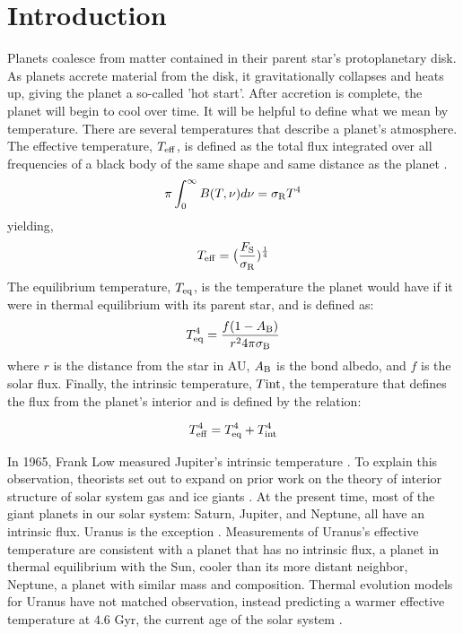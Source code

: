 \documentclass[11pt]{ucscthesisbs}
\begin{document}
\chapter{Introduction}
Planets coalesce from matter contained in their parent star's protoplanetary disk. As planets accrete material from the disk, it gravitationally collapses and heats up, giving the planet a so-called 'hot start'. After accretion is complete, the planet will begin to cool over time. It will be helpful to define what we mean by temperature. There are several temperatures that describe a planet's atmosphere. The effective temperature, $T_{\rm eff}$, is defined as the total flux integrated over all frequencies of a black body of the same shape and same distance as the planet \citep{seager_2010}.
\begin{equation}
    \pi \int_{0}^{\infty} B(T, \nu) d\nu = \sigma_{\rm R}T^{4}
  \label{eq:effective_temp_integral}
\end{equation}  
yielding,
\begin{equation}
    T_{\rm eff} = \big(\frac{F_{\rm S}}{\sigma_{\rm R}})^{\frac{1}{4}} 
  \label{eq:effective_temp}
\end{equation} 
The equilibrium temperature, $T_{\rm eq}$, is the temperature the planet would have if it were in thermal equilibrium with its parent star, and is defined as:
\begin{equation}
    T_{\rm eq}^4 = \frac{f(1-A_{\rm B})}{r^{2} 4 \pi \sigma_{\rm B}}
  \label{eq:equilibrium_temp}
\end{equation} 
where $r$ is the distance from the star in AU, $A_{\rm B}$ is the bond albedo, and $f$ is the solar flux. Finally, the intrinsic temperature, $T{\rm int}$, the temperature that defines the flux from the planet's interior and is defined by the relation:

\begin{equation}
    T_{\rm eff}^4 =  T_{\rm eq}^4 +  T_{\rm int}^4
  \label{eq:effective_temp}
\end{equation} 

In 1965, Frank Low measured Jupiter's intrinsic temperature \citep{low_1966}. To explain this observation, theorists set out to expand on prior work \citep{demarcus_1958} on the theory of interior structure of solar system gas and ice giants \citep{hubbard_1968, smoluchowski_1967,hubbard_1977, hubbard_1977_2, podolak_1991}. At the present time, most of the giant planets in our solar system: Saturn, Jupiter, and Neptune, all have an intrinsic flux. Uranus is the exception \citep{pearl_conrath_1991}. Measurements of Uranus's effective temperature are consistent with a planet that has no intrinsic flux, a planet in thermal equilibrium with the Sun, cooler than its more distant neighbor, Neptune, a planet with similar mass and composition. Thermal evolution models for Uranus have not matched observation, instead predicting a warmer effective temperature at $4.6$ Gyr, the current age of the solar system \citep{fortney_2011, podolak_1991, hubbard_1995, scheibe_2019}.
\end{document}
